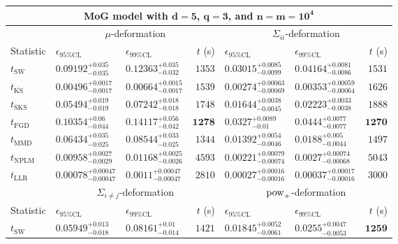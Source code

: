 \begin{tabular}{l|llr|llr}
	\toprule
	\multicolumn{7}{c}{{\bf MoG model with $\mathbf{d=5}$, $\mathbf{q=3}$, and $\mathbf{n=m=10^{4}}$}} \\
	\toprule
	\multicolumn{1}{c}{} & \multicolumn{3}{c}{$\mu$-deformation} & \multicolumn{3}{c}{$\Sigma_{ii}$-deformation} \\
	Statistic & $\epsilon_{95\%\mathrm{CL}}$ & $\epsilon_{99\%\mathrm{CL}}$ & $t$ (s) & $\epsilon_{95\%\mathrm{CL}}$ & $\epsilon_{99\%\mathrm{CL}}$ & $t$ (s) \\
	\midrule
	$t_{\mathrm{SW}}$ & $0.09192_{-0.035}^{+0.035}$ & $0.12363_{-0.032}^{+0.035}$ & $1353$ & $0.03015_{-0.0099}^{+0.0085}$ & $0.04164_{-0.0086}^{+0.0081}$ & $1531$ \\
	$t_{\overline{\mathrm{KS}}}$ & ${\mathbf{0.00496_{-0.0017}^{+0.0017}}}$ & ${\mathbf{0.00664_{-0.0017}^{+0.0015}}}$ & $1539$ & ${\mathbf{0.00274_{-0.00069}^{+0.00063}}}$ & ${\mathbf{0.00353_{-0.00064}^{+0.00059}}}$ & $1626$ \\
	$t_{\mathrm{SKS}}$ & $0.05494_{-0.019}^{+0.019}$ & $0.07242_{-0.018}^{+0.018}$ & $1748$ & $0.01644_{-0.0045}^{+0.0038}$ & $0.02223_{-0.0038}^{+0.0033}$ & $1888$ \\
	$t_{\mathrm{FGD}}$ & $0.10354_{-0.044}^{+0.06}$ & $0.14117_{-0.042}^{+0.056}$ & ${\mathbf{1278}}$ & $0.0327_{-0.01}^{+0.0089}$ & $0.0444_{-0.0077}^{+0.0077}$ & ${\mathbf{1270}}$ \\
	$t_{\mathrm{MMD}}$ & $0.06434_{-0.025}^{+0.035}$ & $0.08544_{-0.025}^{+0.033}$ & $1344$ & $0.01392_{-0.0046}^{+0.0054}$ & $0.0188_{-0.0044}^{+0.005}$ & $1497$ \\
\rowcolor{red!35}	$t_{\mathrm{NPLM}}$ & $0.00958_{-0.0029}^{+0.0027}$ & $0.01168_{-0.0026}^{+0.0025}$ & $4593$ & $0.00221_{-0.00074}^{+0.00079}$ & $0.0027_{-0.00068}^{+0.00074}$ & $5043$ \\
	$t_{\mathrm{LLR}}$ & $0.00078_{-0.00047}^{+0.00047}$ & $0.0011_{-0.00047}^{+0.00047}$ & $2810$ & $0.00027_{-0.00016}^{+0.00016}$ & $0.00037_{-0.00016}^{+0.00017}$ & $3000$ \\
	\toprule
	\multicolumn{1}{c}{} & \multicolumn{3}{c}{$\Sigma_{i\neq j}$-deformation} & \multicolumn{3}{c}{$\rm{pow}_{+}$-deformation} \\
	Statistic & $\epsilon_{95\%\mathrm{CL}}$ & $\epsilon_{99\%\mathrm{CL}}$ & $t$ (s) & $\epsilon_{95\%\mathrm{CL}}$ & $\epsilon_{99\%\mathrm{CL}}$ & $t$ (s) \\
	\midrule
	$t_{\mathrm{SW}}$ & $0.05949_{-0.018}^{+0.013}$ & $0.08161_{-0.014}^{+0.01}$ & $1421$ & $0.01845_{-0.0061}^{+0.0052}$ & $0.0255_{-0.0053}^{+0.0047}$ & ${\mathbf{1259}}$ \\

\end{tabular}
